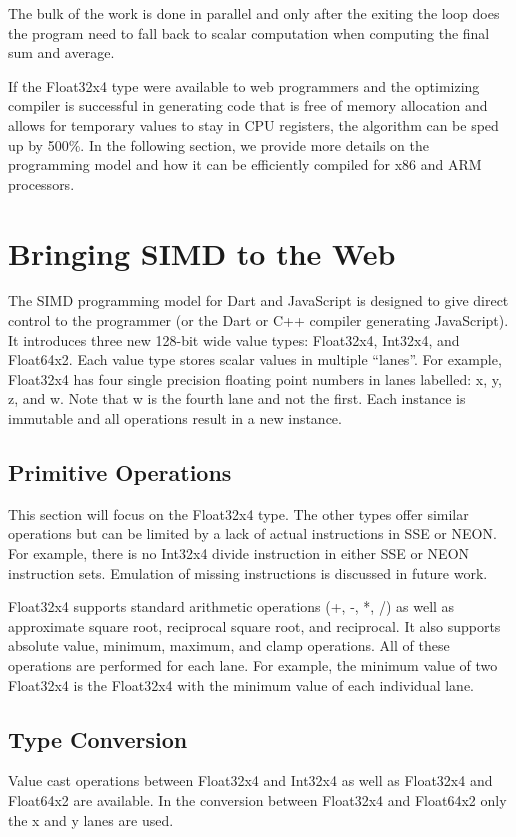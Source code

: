 \documentclass[preprint]{sigplanconf}
\begin{document}
The bulk of the work is done in parallel and only after the exiting the loop does the program need to fall back to scalar computation when computing the final sum and average.

If the Float32x4 type were available to web programmers and the optimizing compiler is successful in generating code that is free of memory allocation and allows for temporary values to stay in CPU registers, the algorithm can be sped up by 500\%. In the following section, we provide more details on the programming model and how it can be efficiently compiled for x86 and ARM processors.

\section{Bringing SIMD to the Web}
The SIMD programming model for Dart and JavaScript is designed to give direct control to the programmer (or the Dart or C++ compiler generating JavaScript). It introduces three new 128-bit wide value types: Float32x4, Int32x4, and Float64x2. Each value type stores scalar values in multiple ``lanes''. For example, Float32x4 has four single precision floating point numbers in lanes labelled: x, y, z, and w. Note that w is the fourth lane and not the first. Each instance is immutable and all operations result in a new instance.

\subsection{Primitive Operations}
This section will focus on the Float32x4 type. The other types offer similar operations but can be limited by a lack of actual instructions in SSE or NEON. For example, there is no Int32x4 divide instruction in either SSE or NEON instruction sets. Emulation of missing instructions is discussed in future work.

Float32x4 supports standard arithmetic operations (+, -, *, /) as well as approximate square root, reciprocal square root, and reciprocal. It also supports absolute value, minimum, maximum, and clamp operations. All of these operations are performed for each lane. For example, the minimum value of two Float32x4 is the Float32x4 with the minimum value of each individual lane.

\subsection{Type Conversion}
Value cast operations between Float32x4 and Int32x4 as well as Float32x4 and Float64x2 are available. In the conversion between Float32x4 and Float64x2 only the x and y lanes are used.
\end{document}
